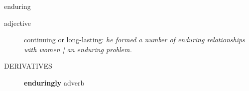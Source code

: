 \documentclass[avery5372, grid]{flashcards}
\begin{document}
\begin{flashcard}{\Huge enduring}
\begin{description}
		\item[adjective] %
			continuing or long-lasting: \textit{he formed a number of enduring relationships with women | an enduring problem.}
			
			
			
			
			
			
			
			
			
		\item[\textsc{DERIVATIVES}] \textbf{en\textbullet dur\textbullet ing\textbullet ly} adverb
	\end{description}
\end{flashcard}







				
\end{document}
